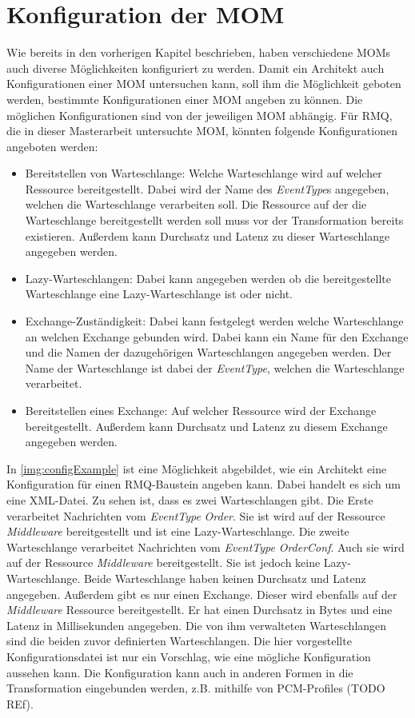 \section{Konfiguration der MOM}
Wie bereits in den vorherigen Kapitel beschrieben, haben verschiedene MOMs auch diverse Möglichkeiten konfiguriert zu werden. Damit ein Architekt auch Konfigurationen einer MOM untersuchen kann, soll ihm die Möglichkeit geboten werden, bestimmte Konfigurationen einer MOM angeben zu können. Die möglichen Konfigurationen sind von der jeweiligen MOM abhängig. Für RMQ, die in dieser Masterarbeit untersuchte MOM, könnten folgende Konfigurationen angeboten werden:
\begin{itemize}
    \item Bereitstellen von Warteschlange: Welche Warteschlange wird auf welcher Ressource bereitgestellt. Dabei wird der Name des \emph{EventType}s angegeben, welchen die Warteschlange verarbeiten soll. Die Ressource auf der die Warteschlange bereitgestellt werden soll muss vor der Transformation bereits existieren. Außerdem kann Durchsatz und Latenz zu dieser Warteschlange angegeben werden.
    \item Lazy-Warteschlangen: Dabei kann angegeben werden ob die bereitgestellte Warteschlange eine Lazy-Warteschlange ist oder nicht. 
    \item Exchange-Zuständigkeit: Dabei kann festgelegt werden welche Warteschlange an welchen Exchange gebunden wird. Dabei kann ein Name für den Exchange und die Namen der dazugehörigen Warteschlangen angegeben werden. Der Name der Warteschlange ist dabei der \emph{EventType}, welchen die Warteschlange verarbeitet.
    \item Bereitstellen eines Exchange: Auf welcher Ressource wird der Exchange bereitgestellt. Außerdem kann Durchsatz und Latenz zu diesem Exchange angegeben werden.
\end{itemize}
In \autoref{img:configExample} ist eine Möglichkeit abgebildet, wie ein Architekt eine Konfiguration für einen RMQ-Baustein angeben kann. Dabei handelt es sich um eine XML-Datei. Zu sehen ist, dass es zwei Warteschlangen gibt. Die Erste verarbeitet Nachrichten vom \emph{EventType} \emph{Order}. Sie ist wird auf der Ressource \emph{Middleware} bereitgestellt und ist eine Lazy-Warteschlange. Die zweite Warteschlange verarbeitet Nachrichten vom \emph{EventType} \emph{OrderConf}. Auch sie wird auf der Ressource \emph{Middleware} bereitgestellt. Sie ist jedoch keine Lazy-Warteschlange. Beide Warteschlange haben keinen Durchsatz und Latenz angegeben. Außerdem gibt es nur einen Exchange. Dieser wird ebenfalls auf der \emph{Middleware} Ressource bereitgestellt. Er hat einen Durchsatz in Bytes und eine Latenz in Millisekunden angegeben. Die von ihm verwalteten Warteschlangen sind die beiden zuvor definierten Warteschlangen. Die hier vorgestellte Konfigurationsdatei ist nur ein Vorschlag, wie eine mögliche Konfiguration aussehen kann. Die Konfiguration kann auch in anderen Formen in die Transformation eingebunden werden, z.B. mithilfe von PCM-Profiles (TODO REf).

